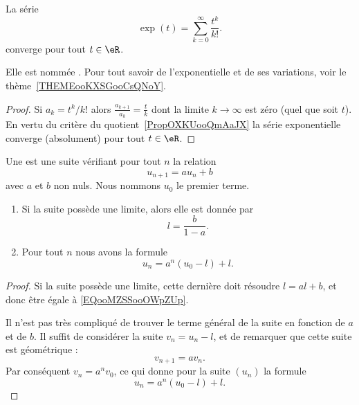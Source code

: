\begin{lemma} \label{ExIJMHooOEUKfj}
	La série
	\begin{equation}
		\exp(t)=\sum_{k=0}^{\infty}\frac{ t^k }{ k! }.
	\end{equation}
	converge pour tout \( t\in \eR\).

	Elle est nommée . Pour tout savoir de l'exponentielle et de ses variations, voir le thème~\ref{THEMEooKXSGooCsQNoY}.
\end{lemma}

\begin{proof}
	Si \( a_k=t^k/k!\) alors \( \frac{ a_{k+1} }{ a_k }=\frac{ t }{ k }\) dont la limite \( k\to \infty\) est zéro (quel que soit \( t\)). En vertu du critère du quotient~\ref{PropOXKUooQmAaJX} la série exponentielle converge (absolument) pour tout \( t\in \eR\).
\end{proof}

\begin{lemma}      \label{LEMooCVIQooUtuzgE}
	Une  est une suite vérifiant pour tout \( n\) la relation
	\begin{equation}
		u_{n+1}=au_n+b
	\end{equation}
	avec \( a\) et \( b\) non nuls. Nous nommons \( u_0\) le premier terme.

	\begin{enumerate}
		\item
		      Si la suite possède une limite, alors elle est donnée par
		      \begin{equation}    \label{EQooMZSSooOWpZUp}
			      l=\frac{ b }{ 1-a }.
		      \end{equation}
		\item
		      Pour tout \( n\) nous avons la formule
		      \begin{equation}
			      u_n=a^n(u_0-l)+l.
		      \end{equation}
	\end{enumerate}
\end{lemma}


\begin{proof}
	Si la suite possède une limite, cette dernière doit résoudre \( l=al+b\), et donc être égale à \eqref{EQooMZSSooOWpZUp}.

	Il n'est pas très compliqué de trouver le terme général de la suite en fonction de \( a\) et de \( b\). Il suffit de considérer la suite \( v_n=u_n-l\), et de remarquer que cette suite est géométrique :
	\begin{equation}
		v_{n+1}=av_n.
	\end{equation}
	Par conséquent \( v_n=a^nv_0\), ce qui donne pour la suite \( (u_n)\) la formule
	\begin{equation}
		u_n=a^n(u_0-l)+l.
	\end{equation}
\end{proof}


